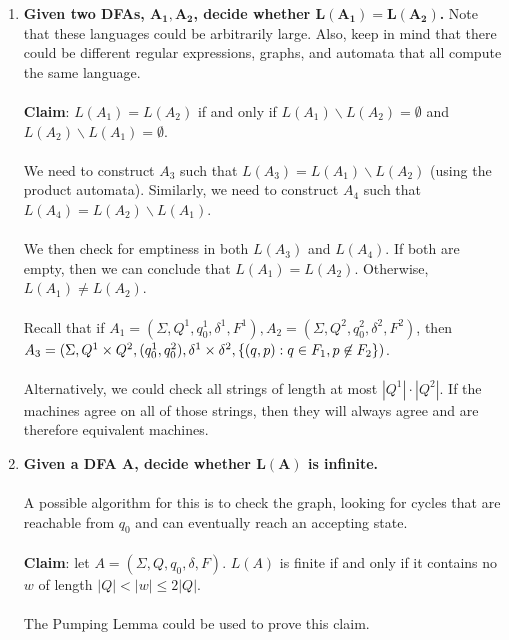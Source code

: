 \documentclass[]{article}
\DeclarePairedDelimiter{\set}{\lbrace}{\rbrace}
\theoremstyle{definition}
\begin{document}
\begin{enumerate}
          \item \textbf{Given two DFAs, $\boldsymbol{A_1, A_2}$, decide whether $\boldsymbol{L(A_1) = L(A_2)}$.} Note that these languages could be arbitrarily large. Also, keep in mind that there could be different regular expressions, graphs, and automata that all compute the same language.
          \\ \\
          \textbf{Claim}: $L(A_1) = L(A_2)$ if and only if $L(A_1) \backslash L(A_2) = \emptyset$ and $L(A_2) \backslash L(A_1) = \emptyset$.
          \\ \\
          We need to construct $A_3$ such that $L(A_3) = L(A_1) \backslash L(A_2)$ (using the product automata). Similarly, we need to construct $A_4$ such that $L(A_4) = L(A_2) \backslash L(A_1)$.
          \\ \\
          We then check for emptiness in both $L(A_3)$ and $L(A_4)$. If both are empty, then we can conclude that $L(A_1) = L(A_2)$. Otherwise, $L(A_1) \ne L(A_2)$.
          \\ \\
          Recall that if $A_1 = (\Sigma, Q^1, q_0^1, \delta^1, F^1), A_2 = (\Sigma, Q^2, q_0^2, \delta^2, F^2)$, then $A_3 = (\Sigma, Q^1 \times Q^2, (q_0^1, q_0^2), \delta^1 \times \delta^2, \set{ (q, p) : q \in F_1, p \not \in F_2 })$.
          \\ \\
          Alternatively, we could check all strings of length at most $|Q^1| \cdot |Q^2|$. If the machines agree on all of those strings, then they will always agree and are therefore equivalent machines.

          \item \textbf{Given a DFA $\boldsymbol{A}$, decide whether $\boldsymbol{L(A)}$ is infinite.}
          \\ \\
          A possible algorithm for this is to check the graph, looking for cycles that are reachable from $q_0$ and can eventually reach an accepting state.
          \\ \\
          \textbf{Claim}: let $A = (\Sigma, Q, q_0, \delta, F)$. $L(A)$ is finite if and only if it contains no $w$ of length $|Q| < |w| \le 2|Q|$.
          \\ \\
          The Pumping Lemma could be used to prove this claim.
        \end{enumerate}
\end{document}
